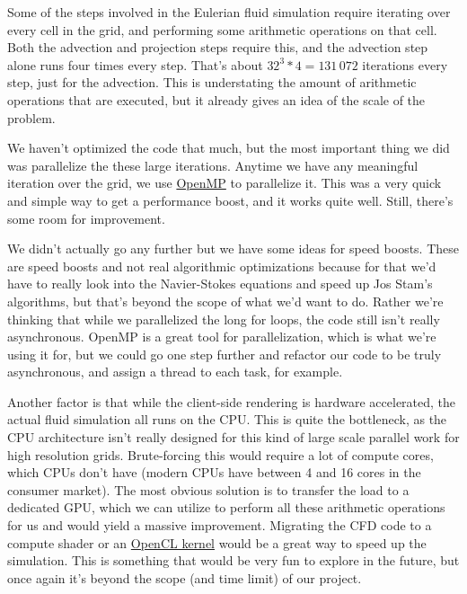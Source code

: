 \documentclass[a4paper,12pt,titlepage]{article}
\begin{document}
Some of the steps involved in the Eulerian fluid simulation require iterating
over every cell in the grid, and performing some arithmetic operations on that cell.
Both the advection and projection steps require this, and the advection step
alone runs four times every step. That's about $32^3 * 4 = 131\,072$ iterations
every step, just for the advection. This is understating the amount of arithmetic
operations that are executed, but it already gives an idea of the scale of the
problem.

We haven't optimized the code that much, but the most important thing we did was
parallelize the these large iterations. Anytime we have any meaningful iteration
over the grid, we use \href{www.openmp.org}{OpenMP} to parallelize it. This was
a very quick and simple way to get a performance boost, and it works quite well.
Still, there's some room for improvement.

We didn't actually go any further but we have some ideas for speed boosts. These
are speed boosts and not real algorithmic optimizations because for that we'd have
to really look into the Navier-Stokes equations and speed up Jos Stam's algorithms,
but that's beyond the scope of what we'd want to do. Rather we're thinking that
while we parallelized the long for loops, the code still isn't really asynchronous.
OpenMP is a great tool for parallelization, which is what we're using it for,
but we could go one step further and refactor our code to be truly asynchronous,
and assign a thread to each task, for example.

Another factor is that while the client-side rendering is hardware accelerated,
the actual fluid simulation all runs on the CPU. This is quite the bottleneck,
as the CPU architecture isn't really designed for this kind of large scale
parallel work for high resolution grids. Brute-forcing this would require a lot
of compute cores, which CPUs don't have (modern CPUs have between 4 and 16 cores
in the consumer market). The most obvious solution is to transfer the load to
a dedicated GPU, which we can utilize to perform all these arithmetic operations
for us and would yield a massive improvement. Migrating the CFD code to a compute
shader or an \href{https://en.wikipedia.org/wiki/OpenCL}{OpenCL kernel} would
be a great way to speed up the simulation. This is something that would be very
fun to explore in the future, but once again it's beyond the scope (and time limit)
of our project.
\end{document}
